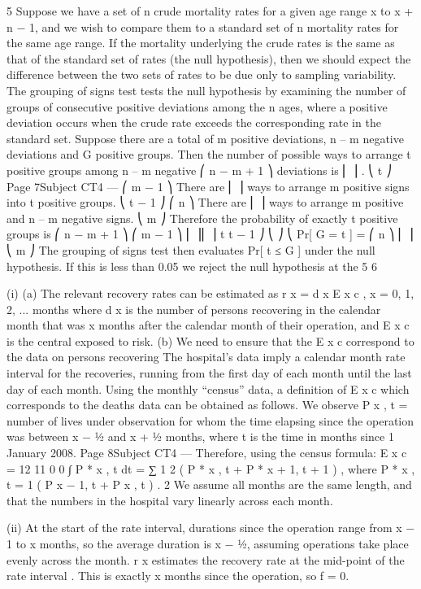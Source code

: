 5
Suppose we have a set of n crude mortality rates for a given age range x to x + n − 1,
and we wish to compare them to a standard set of n mortality rates for the same age
range.
If the mortality underlying the crude rates is the same as that of the standard set of
rates (the null hypothesis), then we should expect the difference between the two sets
of rates to be due only to sampling variability.
The grouping of signs test tests the null hypothesis by examining the number of
groups of consecutive positive deviations among the n ages, where a positive
deviation occurs when the crude rate exceeds the corresponding rate in the standard
set.
Suppose there are a total of m positive deviations, n – m negative deviations and G
positive groups.
Then the number of possible ways to arrange t positive groups among n – m negative
⎛ n − m + 1 ⎞
deviations is ⎜
⎟ .
⎝ t
⎠
Page 7Subject CT4 — %
⎛ m − 1 ⎞
There are ⎜
⎟ ways to arrange m positive signs into t positive groups.
⎝ t − 1 ⎠
⎛ n ⎞
There are ⎜ ⎟ ways to arrange m positive and n – m negative signs.
⎝ m ⎠
Therefore the probability of exactly t positive groups is
⎛ n − m + 1 ⎞ ⎛ m − 1 ⎞
⎜
⎟⎜
⎟
t
t − 1 ⎠
⎝
⎠
⎝
Pr[ G = t ] =
⎛ n ⎞
⎜ ⎟
⎝ m ⎠
The grouping of signs test then evaluates Pr[ t ≤ G ] under the null hypothesis.
If this is less than 0.05 we reject the null hypothesis at the 5%
6
\item (i)
(a)
The relevant recovery rates can be estimated as
r x =
d x
E x c
, x = 0, 1, 2, ... months
where d x is the number of persons recovering in the calendar month
that was x months after the calendar month of their operation, and E x c is
the central exposed to risk.
(b)
We need to ensure that the E x c correspond to the data on persons
recovering
The hospital’s data imply a calendar month rate interval for the
recoveries, running from the first day of each month until the last day
of each month.
Using the monthly “census” data, a definition of E x c which corresponds
to the deaths data can be obtained as follows.
We observe P x , t = number of lives under observation for whom the
time elapsing since the operation was between x − 1⁄2 and x + 1⁄2
months, where t is the time in months since 1 January 2008.
Page 8Subject CT4 — %
Therefore, using the census formula:
E x c =
12 11
0 0
∫ P * x , t dt = ∑ 1
2 (
P * x , t + P * x + 1, t + 1 ) ,
where P * x , t = 1 ( P x − 1, t + P x , t ) .
2
We assume all months are the same length, and that the numbers in the
hospital vary linearly across each month.
\item (ii)
At the start of the rate interval, durations since the operation range from x − 1
to x months, so the average duration is x − 1⁄2, assuming operations take place
evenly across the month.
r x estimates the recovery rate at the mid-point of the rate interval .
This is exactly x months since the operation, so f = 0.
